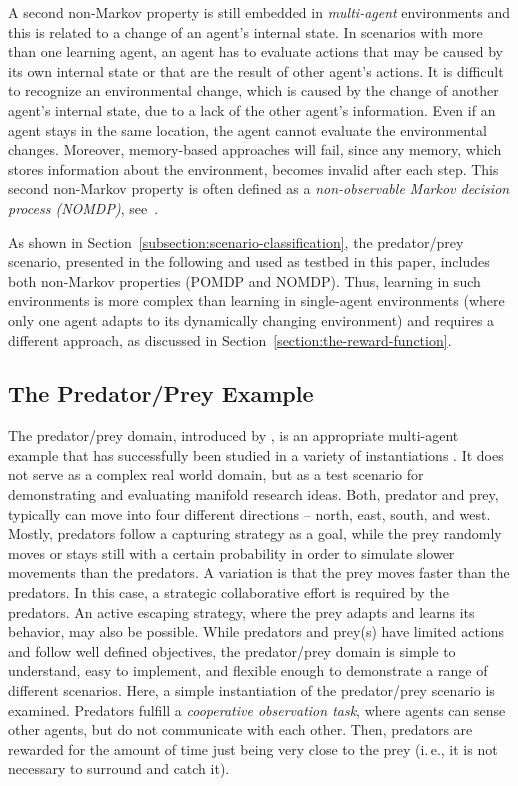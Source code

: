 \documentclass{sig-alternate}
\begin{document}
A second non-Markov property is still embedded in \emph{multi-agent} environments and this is related to a change of an agent's internal state. In scenarios with more than one learning agent, an agent has to evaluate actions that may be caused by its own internal state or that are the result of other agent's actions. It is difficult to recognize an environmental change, which is caused by the change of another agent's internal state, due to a lack of the other agent's information. Even if an agent stays in the same location, the agent cannot evaluate the environmental changes. Moreover, memory-based approaches will fail, since any memory, which stores information about the environment, becomes invalid after each step. This second non-Markov property is often defined as a \emph{non-observable Markov decision process (NOMDP)}, see~\cite{TTS01}.

As shown in Section~\ref{subsection:scenario-classification}, the predator/prey scenario, presented in the following and used as testbed in this paper, includes both non-Markov properties (POMDP and NOMDP). Thus, learning in such environments is more complex than learning in single-agent environments (where only one agent adapts to its dynamically changing environment) and requires a different approach, as discussed in Section~\ref{section:the-reward-function}.

\subsection{The Predator/Prey Example}
\label{section:the-predator-prey-example}

The predator/prey domain, introduced by \cite{BJD86}, is an appropriate multi-agent example that has successfully been studied in a variety of instantiations \cite{SV00}. It does not serve as a complex real world domain, but as a test scenario for demonstrating and evaluating manifold research ideas. 
Both, predator and prey, typically can move into four different directions -- north, east, south, and west. Mostly, predators follow a capturing strategy as a goal, while the prey randomly moves or stays still with a certain probability in order to simulate slower movements than the predators. A variation is that the prey moves faster than the predators. In this case, a strategic collaborative effort is required by the predators. An active escaping strategy, where the prey adapts and learns its behavior, may also be possible.
While predators and prey(s) have limited actions and follow well defined objectives, the predator/prey domain is simple to understand, easy to implement, and flexible enough to demonstrate a range of different scenarios. 
Here, a simple instantiation of the predator/prey scenario is examined. 
Predators fulfill a \emph{cooperative observation task}, where agents can sense other agents, but do not communicate with each other. Then, predators are rewarded for the amount of time just being very close to the prey (i.\,e., it is not necessary to surround and catch it). 
\end{document}
